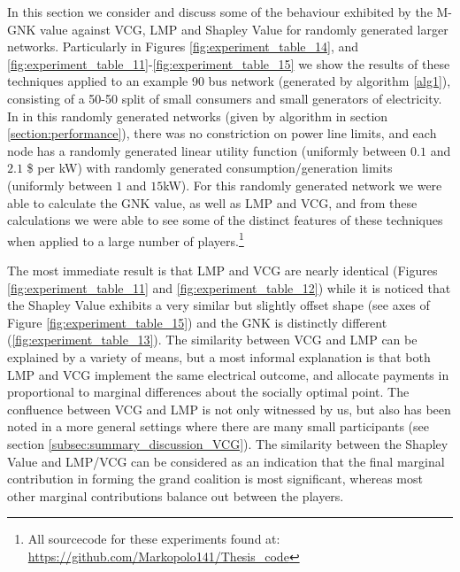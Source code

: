 In this section we consider and discuss some of the behaviour exhibited by the M-GNK value against VCG, LMP and Shapley Value for randomly generated larger networks.
Particularly in Figures \ref{fig:experiment_table_14}, and \ref{fig:experiment_table_11}-\ref{fig:experiment_table_15} we show the results of these techniques applied to an example 90 bus network (generated by algorithm \ref{alg1}), consisting of a 50-50 split of small consumers and small generators of electricity.
In in this randomly generated networks (given by algorithm in section \ref{section:performance}), there was no constriction on power line limits, and each node has a randomly generated linear utility function (uniformly between $0.1$ and $2.1$ \$ per kW) with randomly generated consumption/generation limits (uniformly between $1$ and $15$kW).
For this randomly generated network we were able to calculate the GNK value, as well as LMP and VCG, and from these calculations we were able to see some of the distinct features of these techniques when applied to a large number of players.\footnote{All sourcecode for these experiments found at: \href{https://github.com/Markopolo141/Thesis\_code}{https://github.com/Markopolo141/Thesis\_code}}

The most immediate result is that LMP and VCG are nearly identical (Figures \ref{fig:experiment_table_11} and \ref{fig:experiment_table_12}) while it is noticed that the Shapley Value exhibits a very similar but slightly offset shape (see axes of Figure \ref{fig:experiment_table_15}) and the GNK is distinctly different (\ref{fig:experiment_table_13}).
The similarity between VCG and LMP can be explained by a variety of means, but a most informal explanation is that both LMP and VCG implement the same electrical outcome, and allocate payments in proportional to marginal differences about the socially optimal point.
The confluence between VCG and LMP is not only witnessed by us, but also has been noted in a more general settings where there are many small participants \citep{NATH2019673, 8430852} (see section \ref{subsec:summary_discussion_VCG}).%
The similarity between the Shapley Value and LMP/VCG can be considered as an indication that the final marginal contribution in forming the grand coalition is most significant, whereas most other marginal contributions balance out between the players.

